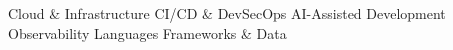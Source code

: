 \begin{cvskills}
  \cvskill
    {Cloud \& Infrastructure}
    {\skillsCloud}
  \cvskill
    {CI/CD \& DevSecOps}
    {\skillsCicd}
  \cvskill
    {AI-Assisted Development}
    {\skillsAi}
  \cvskill
    {Observability}
    {\skillsObservability}
  \cvskill
    {Languages}
    {\skillsLanguages}
  \cvskill
    {Frameworks \& Data}
    {\skillsFrameworks}
\end{cvskills}
